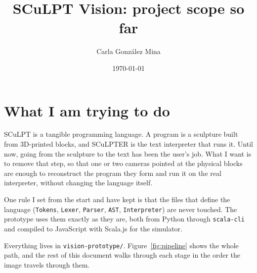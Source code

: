 \documentclass[11pt,a4paper]{article}
\title{SCuLPT Vision: project scope so far}
\author{Carla González Mina}
\date{\today}
\newcommand{\code}[1]{\texttt{#1}}
\begin{document}
\maketitle

\section{What I am trying to do}

SCuLPT is a tangible programming language. A program is a sculpture built from 3D-printed blocks, and SCuLPTER is the text interpreter that runs it. Until now, going from the sculpture to the text has been the user's job. What I want is to remove that step, so that one or two cameras pointed at the physical blocks are enough to reconstruct the program they form and run it on the real interpreter, without changing the language itself.

One rule I set from the start and have kept is that the files that define the language (\code{Tokens}, \code{Lexer}, \code{Parser}, \code{AST}, \code{Interpreter}) are never touched. The prototype uses them exactly as they are, both from Python through \code{scala-cli} and compiled to JavaScript with Scala.js for the simulator.

Everything lives in \code{vision-prototype/}. Figure~\ref{fig:pipeline} shows the whole path, and the rest of this document walks through each stage in the order the image travels through them.
\end{document}
